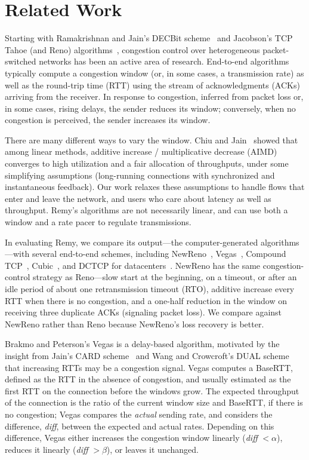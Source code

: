 \section{Related Work}
\label{remy:related}

Starting with Ramakrishnan and Jain's DECBit scheme~\cite{decbit} and
Jacobson's TCP Tahoe (and Reno) algorithms~\cite{Jacobson88},
congestion control over heterogeneous packet-switched networks has
been an active area of research. End-to-end algorithms typically
compute a congestion window (or, in some cases, a transmission rate)
as well as the round-trip time (RTT) using the stream of
acknowledgments (ACKs) arriving from the receiver. In response to
congestion, inferred from packet loss or, in some cases, rising
delays, the sender reduces its window; conversely, when no congestion
is perceived, the sender increases its window.

There are many different ways to vary the window. Chiu and
Jain~\cite{chiujain} showed that among linear methods, additive
increase / multiplicative decrease (AIMD) converges to high
utilization and a fair allocation of throughputs, under some
simplifying assumptions (long-running connections with synchronized
and instantaneous feedback). Our work relaxes these assumptions to
handle flows that enter and leave the network, and users who care
about latency as well as throughput. Remy's algorithms are not
necessarily linear, and can use both a window and a rate pacer to
regulate transmissions.

In evaluating Remy, we compare its output---the computer-generated
algorithms---with several end-to-end schemes, including
NewReno~\cite{newreno}, Vegas~\cite{vegas}, Compound
TCP~\cite{compound}, Cubic~\cite{cubic}, and DCTCP for
datacenters~\cite{dctcp}. NewReno has the same congestion-control
strategy as Reno---slow start at the beginning, on a timeout, or after
an idle period of about one retransmission timeout (RTO), additive
increase every RTT when there is no congestion, and a one-half
reduction in the window on receiving three duplicate ACKs (signaling
packet loss). We compare against NewReno rather than Reno because
NewReno's loss recovery is better.

Brakmo and Peterson's Vegas is a delay-based algorithm, motivated by
the insight from Jain's CARD scheme~\cite{card} and Wang and Crowcroft's
DUAL scheme~\cite{dual} that increasing RTTs may be a congestion
signal.  Vegas computes a BaseRTT, defined as the RTT in the absence
of congestion, and usually estimated as the first RTT on the
connection before the windows grow. The expected throughput of the
connection is the ratio of the current window size and BaseRTT, if
there is no congestion; Vegas compares the {\em actual} sending rate,
and considers the difference, {\em diff}, between the expected and
actual rates.  Depending on this difference, Vegas either increases
the congestion window linearly ({\em diff} $< \alpha$), reduces it
linearly ({\em diff} $> \beta$), or leaves it unchanged.

